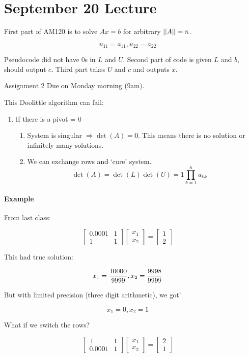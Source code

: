 \section{September 20 Lecture}
First part of AM120 is to solve $Ax=b$ for arbitrary $\left|\left|A\right|\right| = n$.

\[
	u_{11} = a_{11}, u_{22} = a_{22} 
\]

Pseudocode did not have 0s in $L$ and $U$. Second part of code is given $L$ and $b$, should output $c$. Third part takes $U$ and $c$ and outputs $x$.

Assignment 2 Due on Monday morning (9am).

This Doolittle algorithm can fail:
\begin{enumerate}
	\item If there is a pivot = 0
	\begin{enumerate}
		\item System is singular $\Rightarrow \det(A) = 0$. This means there is no solution or infinitely many solutions.
		\item We can exchange rows and `cure' system.
		\[
			\det(A) = \det(L) \det(U) = 1 \prod_{k=1}^n u_{kk}
		\]
	\end{enumerate}
\end{enumerate}


\paragraph{Example} From last class:

\[
	\begin{bmatrix}
		0.0001 & 1 \\ 1 & 1
	\end{bmatrix}
	\begin{bmatrix}
		x_1 \\ x_2
	\end{bmatrix} = 
	\begin{bmatrix}
		1 \\ 2
	\end{bmatrix}
\]

This had true solution:

\[
		x_1 = {10000 \over 9999}, x_2 = {9998 \over 9999}
\]

But with limited precision (three digit arithmetic), we got'

\[
		x_1 = 0, x_2 = 1
\]

What if we switch the rows?

\[
	\begin{bmatrix}
		1 & 1 \\ 0.0001 & 1
	\end{bmatrix}
	\begin{bmatrix}
		x_1 \\ x_2
	\end{bmatrix} = 
	\begin{bmatrix}
		2 \\ 1
	\end{bmatrix}
\]


